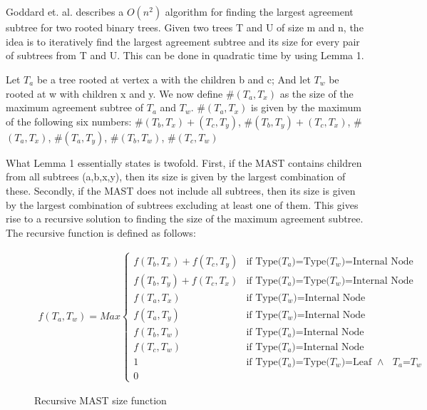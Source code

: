 \chapter{}
Goddard et. al.\cite{nsquared} describes a $O(n^2)$ algorithm for finding the largest agreement subtree for two rooted binary trees. Given two trees T and U of size m and n, the idea is to iteratively find the largest agreement subtree and its size for every pair of subtrees from T and U. This can be done in quadratic time by using Lemma 1. 

\begin{Lemma}
	Let $T_a$ be a tree rooted at vertex a with the children b and c; And let $T_w$ be rooted at w with children x and y. We now define $\#(T_a,T_x)$ as the size of the maximum agreement subtree of $T_a$ and $T_w$.  $\#(T_a,T_x)$ is given by the maximum of the following six numbers: \#$(T_b,T_x)+(T_c,T_y)$,
	\#$(T_b,T_y)+(T_c,T_x)$,
	\#$(T_a,T_x)$,
	\#$(T_a,T_y)$,
	\#$(T_b,T_w)$,
	\#$(T_c,T_w)$
\end{Lemma}

What Lemma 1 essentially states is twofold. First, if the MAST contains children from all subtrees (a,b,x,y), then its size is given by the largest combination of these. Secondly, if the MAST does not include all subtrees, then its size is given by the largest combination of subtrees excluding at least one of them.    
This gives rise to a recursive solution to finding the size of the maximum agreement subtree. The recursive function is defined as follows: 

\begin{figure}
	\begin{equation*}
	\begin{aligned}
	f(T_a,T_w)=Max
	\begin{cases}
	f(T_b,T_x)+f(T_c,T_y) & \text{if Type($T_a$)=Type($T_w$)=Internal Node}
	\\
	f(T_b,T_y)+f(T_c,T_x) & \text{if Type($T_a$)=Type($T_w$)=Internal Node}
	\\
	f(T_a, T_x)           & \text{if Type($T_w$)=Internal Node}
	\\
	f(T_a, T_y)           & \text{if Type($T_w$)=Internal Node}
	\\
	f(T_b, T_w)           & \text{if Type($T_a$)=Internal Node}
	\\
	f(T_c, T_w)           & \text{if Type($T_a$)=Internal Node}
	\\
	1 	                  & \text{if Type($T_a$)=Type($T_w$)=Leaf  $\land$  $T_a$=$T_w$}
	\\
	0                     
	\end{cases}
	\end{aligned}
	\phantom{\hspace{6cm}}
	\end{equation*}
	\caption{Recursive MAST size function}
	\label{Fig:Function1}
\end{figure}


